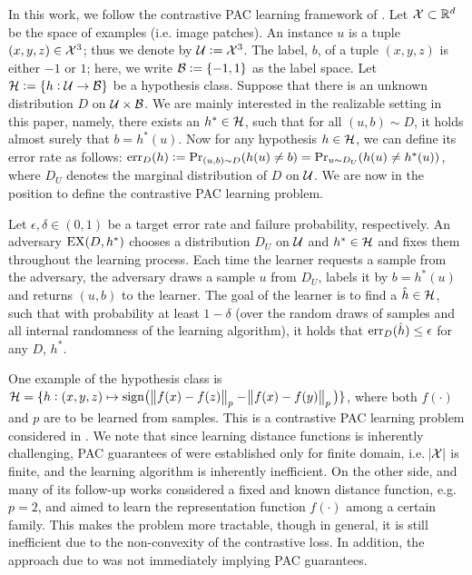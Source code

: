 In this work, we follow the contrastive PAC learning framework of \citet{alon2024contrastive}. Let $\mathcal{X} \subset \mathbb{R}^{d}$ be the space of examples (i.e. image patches). An instance $u$ is a tuple $(x, y, z) \in \mathcal{X}^3$; thus we denote by $\mathcal{U} := \mathcal{X}^3$. The label, $b$, of a tuple $(x, y, z)$ is either $-1$ or $1$; here, we write $\mathcal{B} := \{-1, 1\}$ as the label space. Let $\mathcal{H} := \{ h: \mathcal{U} \rightarrow \mathcal{B} \}$ be a hypothesis class. Suppose that there is an unknown distribution $D$ on $\mathcal{U} \times \mathcal{B}$. We are mainly interested in the realizable setting in this paper, namely, there exists an $h^* \in \mathcal{H}$, such that for all $(u, b) \sim D$, it holds almost surely that $b = h^*(u)$. Now for any hypothesis $h \in \mathcal{H}$, we can define its error rate as follows: $\mathrm{err}_D(h) := \mathrm{Pr}_{(u, b) \sim D}( h(u) \neq b) = \mathrm{Pr}_{u \sim D_U}( h(u) \neq h^*(u))$, where $D_U$ denotes the marginal distribution of $D$ on $\mathcal{U}$. We are now in the position to define the contrastive PAC learning problem.


\begin{definition}\label{def:CPAC}
Let $\epsilon, \delta \in (0, 1)$ be a target error rate and failure probability, respectively. An adversary $\mathrm{EX}(D, h^*)$ chooses a distribution $D_U$ on $\mathcal{U}$ and $h^* \in \mathcal{H}$ and fixes them throughout the learning process. Each time the learner requests a sample from the adversary, the adversary draws a sample $u$ from $D_U$, labels it by $b = h^*(u)$ and returns $(u, b)$ to the learner. The goal of the learner is to find a $\hat{h} \in \mathcal{H}$, such that with probability at least $1-\delta$ (over the random draws of samples and all internal randomness of the learning algorithm), it holds that $\mathrm{err}_D(\hat{h}) \leq \epsilon$ for any $D$, $h^*$.
\end{definition}

One example of the hypothesis class is $\mathcal{H} = \{h: (x, y, z) \mapsto \mathrm{sign}\big( \norm{ f(x) -  f(z)}_p - \norm{ f(x) - f(y)}_p \big) \}$, where both $f(\cdot)$ and $p$ are to be learned from samples. This is a contrastive PAC learning problem considered in \cite{alon2024contrastive}. We note that since learning distance functions is inherently challenging, PAC guarantees of \cite{alon2024contrastive} were established only for finite domain, i.e. $\abs{\mathcal{X}}$ is finite, and the learning algorithm is inherently inefficient. On the other side, \cite{arora2019contrastive} and many of its follow-up works considered a fixed and known distance function, e.g. $p = 2$, and aimed to learn the representation function $f(\cdot)$ among a certain family. This makes the problem more tractable, though in general, it is still inefficient due to the non-convexity of the contrastive loss. In addition, the approach due to \cite{arora2019contrastive} was not immediately implying PAC guarantees.

